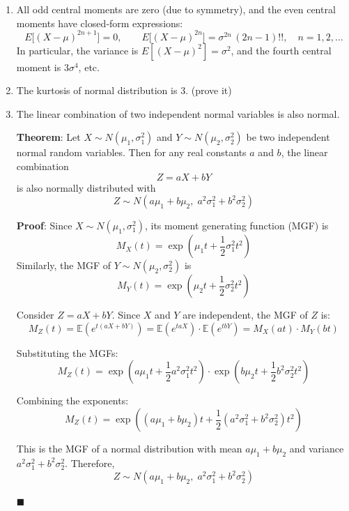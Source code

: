 \documentclass[twoside]{book}
\begin{document}
\begin{enumerate}
  \item All odd central moments are zero (due to symmetry), and the even central moments have closed‐form expressions:
    \[
      E\bigl[(X-\mu)^{2n+1}\bigr] = 0,
      \qquad
      E\bigl[(X-\mu)^{2n}\bigr] = \sigma^{2n}\,(2n - 1)!!,
      \quad n = 1,2,\dots
    \]
    In particular, the variance is \(E[(X-\mu)^2]=\sigma^2\), and the fourth central moment is \(3\sigma^4\), etc.

   \item The kurtosis of normal distribution is 3. (prove it)

	\item The linear combination of two independent normal variables is also normal.

	\begin{textbox}
		\textbf{Theorem}: Let \( X \sim N(\mu_1, \sigma_1^2) \) and \( Y \sim N(\mu_2, \sigma_2^2) \) be two independent normal random variables. Then for any real constants \( a \) and \( b \), the linear combination
		\[
		Z = aX + bY
		\]
		is also normally distributed with
		\[
		Z \sim N\left( a\mu_1 + b\mu_2,\; a^2 \sigma_1^2 + b^2 \sigma_2^2 \right)
		\]
	\end{textbox}

	\textbf{Proof}: Since \( X \sim N(\mu_1, \sigma_1^2) \), its moment generating function (MGF) is
		\[
		M_X(t) = \exp\left( \mu_1 t + \frac{1}{2} \sigma_1^2 t^2 \right)
		\]
		Similarly, the MGF of \( Y \sim N(\mu_2, \sigma_2^2) \) is
		\[
		M_Y(t) = \exp\left( \mu_2 t + \frac{1}{2} \sigma_2^2 t^2 \right)
		\]

		Consider \( Z = aX + bY \). Since \( X \) and \( Y \) are independent, the MGF of \( Z \) is:
		\[
		M_Z(t) = \mathbb{E}\left( e^{t(aX + bY)}\right)  = \mathbb{E}\left( e^{taX}\right)  \cdot \mathbb{E}\left( e^{tbY}\right)  = M_X(at) \cdot M_Y(bt)
		\]

		Substituting the MGFs:
		\[
		M_Z(t) = \exp\left( a\mu_1 t + \frac{1}{2} a^2 \sigma_1^2 t^2 \right) \cdot \exp\left( b\mu_2 t + \frac{1}{2} b^2 \sigma_2^2 t^2 \right)
		\]

		Combining the exponents:
		\[
		M_Z(t) = \exp\left( (a\mu_1 + b\mu_2)t + \frac{1}{2}(a^2 \sigma_1^2 + b^2 \sigma_2^2)t^2 \right)
		\]

		This is the MGF of a normal distribution with mean \( a\mu_1 + b\mu_2 \) and variance \( a^2 \sigma_1^2 + b^2 \sigma_2^2 \). Therefore,
		\[
		Z \sim N\left( a\mu_1 + b\mu_2,\; a^2 \sigma_1^2 + b^2 \sigma_2^2 \right)
		\]

		\hfill $\blacksquare$


\end{enumerate}
\end{document}
